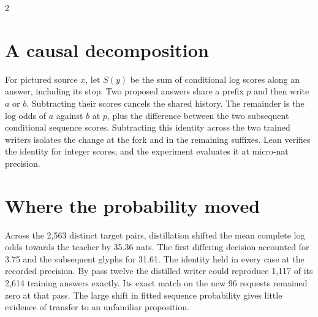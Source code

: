 \begin{multicols}{2}
\section*{A causal decomposition}
For pictured source $x$, let $S(y)$ be the sum of conditional log scores along an answer, including its stop. Two proposed answers share a prefix $p$ and then write $a$ or $b$. Subtracting their scores cancels the shared history. The remainder is the log odds of $a$ against $b$ at $p$, plus the difference between the two subsequent conditional sequence scores. Subtracting this identity across the two trained writers isolates the change at the fork and in the remaining suffixes. Lean verifies the identity for integer scores, and the experiment evaluates it at micro-nat precision.
\section*{Where the probability moved}
Across the 2,563 distinct target pairs, distillation shifted the mean complete log odds towards the teacher by 35.36 nats. The first differing decision accounted for 3.75 and the subsequent glyphs for 31.61. The identity held in every case at the recorded precision. By pass twelve the distilled writer could reproduce 1,117 of its 2,614 training answers exactly. Its exact match on the new 96 requests remained zero at that pass. The large shift in fitted sequence probability gives little evidence of transfer to an unfamiliar proposition.
\end{multicols}
